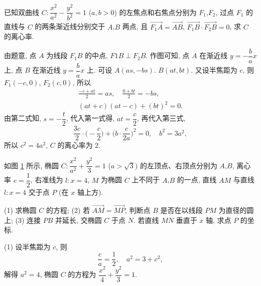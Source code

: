 \begin{example}
    已知双曲线 $C\colon \dfrac{x^2}{a^2}- \dfrac{y^2}{b^2}=1$ ($a,b>0$) 的左焦点和右焦点分别为 $F_1$,$F_2$, 过点 $F_1$ 的直线与 $C$ 的两条渐近线分别交于 $A$,$B$ 两点, 且 $\overrightarrow{F_1A}= \overrightarrow{AB}$, $\overrightarrow{F_1B}\cdot \overrightarrow{F_2B}= 0$, 求 $C$ 的离心率.
\end{example}
\beginsolution
    由题意, 点 $A$ 为线段 $F_1B$ 的中点, $F1B\perp F_2B$. 作图可知, 点 $A$ 在渐近线 $y=-\dfrac{b}a x$ 上, 点 $B$ 在渐近线 $y=\dfrac{b}a x$ 上. 可设 $A(as,-bs)$. $B(at,bt)$. 又设半焦距为 $c$, 则 $F_1(-c,0)$, $F_2(c,0)$, 所以
    \[\begin{gathered}
        \frac{-c+at}{2}= as,\quad \frac{0+bt}{2}= -bs,\\
        (at+c)(at-c)+ (bt)^2= 0.
    \end{gathered}\]
    由第二式知, $s=-\dfrac{t}2$, 代入第一式得, $at= \dfrac{c}2$, 再代入第三式,
    \[\frac{3c}2\cdot\biggl(-\frac{c}2\biggr)
    + \biggl(b\cdot \frac{c}{2a}\biggr)^2= 0,\quad
    b^2= 3a^2,\]
    所以 $c^2= 4a^2$, $C$ 的离心率为 $2$.
\endsolution

\begin{example}
    如图 \ref{fig-190629-1540} 所示, 椭圆 $C\colon\dfrac{x^2}{a^2}+\dfrac{y^2}3=1$ ($a>\sqrt3$) 的左顶点、右顶点分别为 $A$,$B$, 离心率 $e=\dfrac12$, 右准线为 $l\colon x=4$, 
    $M$ 为椭圆 $C$ 上不同于 $A$,$B$ 的一点, 直线 $AM$ 与直线 $l\colon x=4$ 交于点 $P$ (在 $x$ 轴上方).
    
    (1) 求椭圆 $C$ 的方程;\qquad
    (2) 若 $\overrightarrow{AM}= \overrightarrow{MP}$, 判断点 $B$ 是否在以线段 $PM$ 为直径的圆上;\qquad
    (3) 连接 $PB$ 并延长, 交椭圆 $C$ 于点 $N$. 若直线 $MN$ 垂直于 $x$ 轴, 求点 $P$ 的坐标.

    \begin{figure}[htb]
        \small
        \centering
        \caption{}\label{fig-190629-1540}
        \end{figure}
\end{example}
\beginsolution
    (1) 设半焦距为 $c$, 则
    \[\frac{c}a= \frac12,\quad a^2= 3+c^2,\]
    解得 $a^2= 4$, 椭圆 $C$ 的方程为 $\dfrac{x^2}4+ \dfrac{y^2}3= 1$.


